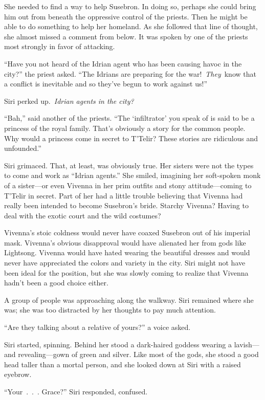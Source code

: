She needed to find a way to help Susebron. In doing so, perhaps she could bring him out from beneath the oppressive control of the priests. Then he might be able to do something to help her homeland. As she followed that line of thought, she almost missed a comment from below. It was spoken by one of the priests most strongly in favor of attacking.

“Have you not heard of the Idrian agent who has been causing havoc in the city?” the priest asked. “The Idrians are preparing for the war!~\textit{They}~know that a conflict is inevitable and so they’ve begun to work against us!”

Siri perked up.~\textit{Idrian agents in the city?}

“Bah,” said another of the priests. “The ‘infiltrator’ you speak of is said to be a princess of the royal family. That’s obviously a story for the common people. Why would a princess come in secret to T’Telir? These stories are ridiculous and unfounded.”

Siri grimaced. That, at least, was obviously true. Her sisters were not the types to come and work as “Idrian agents.” She smiled, imagining her soft-spoken monk of a sister—or even Vivenna in her prim outfits and stony attitude—coming to T’Telir in secret. Part of her had a little trouble believing that Vivenna had really been intended to become Susebron’s bride. Starchy Vivenna? Having to deal with the exotic court and the wild costumes?

Vivenna’s stoic coldness would never have coaxed Susebron out of his imperial mask. Vivenna’s obvious disapproval would have alienated her from gods like Lightsong. Vivenna would have hated wearing the beautiful dresses and would never have appreciated the colors and variety in the city. Siri might not have been ideal for the position, but she was slowly coming to realize that Vivenna hadn’t been a good choice either.

A group of people was approaching along the walkway. Siri remained where she was; she was too distracted by her thoughts to pay much attention.

“Are they talking about a relative of yours?” a voice asked.

Siri started, spinning. Behind her stood a dark-haired goddess wearing a lavish—and revealing—gown of green and silver. Like most of the gods, she stood a good head taller than a mortal person, and she looked down at Siri with a raised eyebrow.

“Your~.~.~. Grace?” Siri responded, confused.

